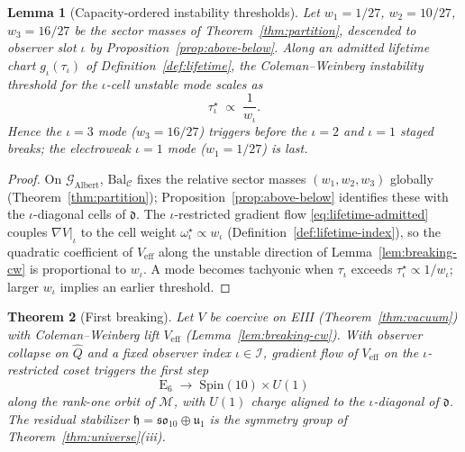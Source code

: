 \documentclass[aps,prd,onecolumn,amsmath,amssymb,nofootinbib,11pt]{revtex4-2}
\numberwithin{equation}{section}
\theoremstyle{plain}
\newtheorem{theorem}{Theorem}[section]
\newtheorem{lemma}[theorem]{Lemma}
\theoremstyle{definition}
\theoremstyle{remark}
\newcommand{\E}[1]{\mathrm{E}_{#1}}
\newcommand{\Spin}{\mathrm{Spin}}
\begin{document}
\begin{lemma}[Capacity-ordered instability thresholds]
\label{lem:breaking-capacity-order}
Let $w_1=1/27$, $w_2=10/27$, $w_3=16/27$ be the sector masses of
Theorem~\ref{thm:partition}, descended to observer slot $\iota$ by
Proposition~\ref{prop:above-below}. Along an admitted lifetime chart
$g_\iota(\tau_\iota)$ of Definition~\ref{def:lifetime}, the Coleman--Weinberg
instability threshold for the $\iota$-cell unstable mode scales as
\begin{equation}\label{eq:breaking-threshold}
  \tau_\iota^\star \;\propto\; \frac{1}{w_\iota}.
\end{equation}
Hence the $\iota=3$ mode ($w_3=16/27$) triggers before the $\iota=2$ and
$\iota=1$ staged breaks; the electroweak $\iota=1$ mode ($w_1=1/27$) is last.
\end{lemma}

\begin{proof}
On $\mathcal{G}_{\mathrm{Albert}}$, $\mathrm{Bal}_{\mathcal{C}}$ fixes the
relative sector masses $(w_1,w_2,w_3)$ globally (Theorem~\ref{thm:partition});
Proposition~\ref{prop:above-below} identifies these with the $\iota$-diagonal
cells of $\mathfrak{d}$. The $\iota$-restricted gradient flow
\eqref{eq:lifetime-admitted} couples $\nabla V|_\iota$ to the cell weight
$\omega^\star_\iota\propto w_\iota$ (Definition~\ref{def:lifetime-index}), so
the quadratic coefficient of $V_{\mathrm{eff}}$ along the unstable direction
of Lemma~\ref{lem:breaking-cw} is proportional to $w_\iota$. A mode becomes
tachyonic when $\tau_\iota$ exceeds $\tau_\iota^\star\propto 1/w_\iota$; larger
$w_\iota$ implies an earlier threshold.
\end{proof}

\begin{theorem}[First breaking]\label{thm:breaking-e6so10}
Let $V$ be coercive on EIII (Theorem~\ref{thm:vacuum}) with Coleman--Weinberg
lift $V_{\mathrm{eff}}$ (Lemma~\ref{lem:breaking-cw}). With observer collapse on
$\hat Q$ and a fixed observer index $\iota\in\mathcal{I}$, gradient flow of
$V_{\mathrm{eff}}$ on the $\iota$-restricted coset triggers the first step
\begin{equation}\label{eq:breaking-e6so10}
  \E{6}\;\longrightarrow\; \Spin(10)\times U(1)
\end{equation}
along the rank-one orbit of $\mathcal{M}$, with $U(1)$ charge aligned to the
$\iota$-diagonal of $\mathfrak{d}$. The residual stabilizer
$\mathfrak{h}=\mathfrak{so}_{10}\oplus\mathfrak{u}_1$ is the symmetry group of
Theorem~\ref{thm:universe}(iii).
\end{theorem}
\end{document}
